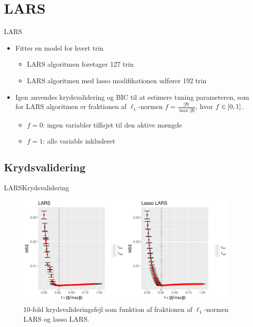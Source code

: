 \section{LARS}
\begin{frame}{LARS}
\begin{itemize}
\item Fitter en model for hvert trin
\begin{itemize}
\item LARS algoritmen foretager 127 trin 
\item LARS algoritmen med lasso modifikationen udfører 192 trin 
\end{itemize}
\item Igen anvendes krydsvalidering og BIC til at estimere tuning parameteren, som for LARS algoritmen er fraktionen af \(\ell_1\)-normen \(f = \frac{\vert \boldsymbol{\beta} \vert}{\max \vert \boldsymbol{\beta} \vert}\), hvor \(f \in \sbr{0,1}\).
\begin{itemize}
\item \(f = 0\): ingen variabler tilføjet til den aktive mængde
\item \(f = 1\): alle variable inkluderet
\end{itemize}
\end{itemize}
\end{frame}

\subsection{Krydsvalidering}

\begin{frame}{LARS}{Krydsvalidering}
\begin{figure}
 \includegraphics[width=1\linewidth, height=0.7\textheight]{slides/lars_kryds.pdf}
 \caption{10-fold krydsvalideringsfejl som funktion af fraktionen af \(\ell_1\)-normen LARS og lasso LARS.}
 \end{figure}
\end{frame}


